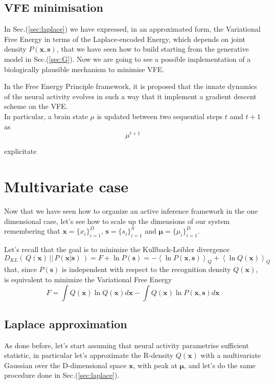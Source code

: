 \documentclass[a4paper, 10pt]{article}
\begin{document}
\subsection{VFE minimisation}
In Sec.(\ref{sec:laplace}) we have expressed, in an approximated form, the Variational Free Energy in terms of the Laplace-encoded Energy, which depends on joint density $P(\mathbf x, \mathbf s)$, that we have seen how to build starting from the generative model in Sec.(\ref{sec:G}). Now we are going to see a possible implementation of a biologically plausible mechanism to minimise VFE.

In the Free Energy Principle framework, it is proposed that the innate dynamics of the neural activity evolves in such a way that it implement a gradient descent scheme on the VFE. \\
In particular, a brain state $\mu$ is updated between two sequential steps $t$ amd $t+1$ as
\begin{equation}
\mu^{t+1}
\end{equation}


explicitate 






\newpage
\section{Multivariate case}
Now that we have seen how to organize an active inference framework in the one dimensional case, let's see how to scale up the dimensions of our system remembering that $\mathbf x = \lbrace x_i \rbrace_{i=1}^D$, $\mathbf s = \lbrace s_i \rbrace_{i=1}^S$ and $\bm \mu = \lbrace \mu_i \rbrace_{i=1}^D$.

Let's recall that the goal is to minimize the Kullback-Leibler  divergence
\begin{equation}
D_{KL} (\, Q(\mathbf x)\, ||\, P(\mathbf x|\mathbf s)\, )  =  F + \ln P(\mathbf s) = - \left< \ln P(\mathbf x,\mathbf s) \right>_{Q} + \left< \ln Q(\mathbf x) \right>_{Q} 
\end{equation}
that, since $P(\mathbf s)$ is independent with respect to the recognition density $Q(\mathbf x)$, is equivalent to minimize the Variational Free Energy
\begin{equation}
F = \int Q(\mathbf x) \ln Q(\mathbf x) d\mathbf x - \int Q(\mathbf x) \ln P(\mathbf x,\mathbf s) d\mathbf x
\end{equation}


\subsection{Laplace approximation}
As done before, let's start assuming that neural activity parametrise sufficient statistic, in particular let's approximate the R-density $Q(\mathbf x)$ with a multivariate Gaussian over the D-dimensional space $\mathbf x$, with peak at $\boldsymbol \mu$, and let's do the same procedure done in Sec.(\ref{sec:laplace}).
\end{document}
